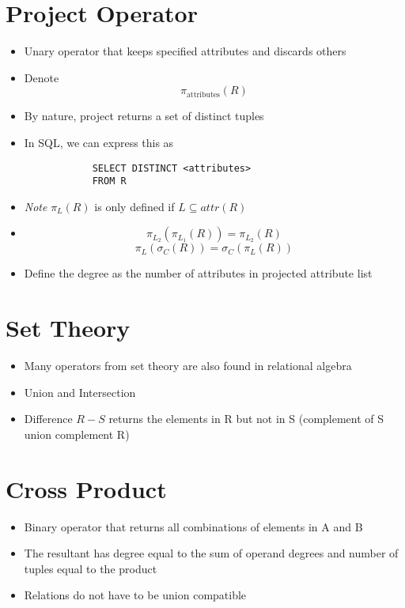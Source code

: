 \documentclass{article}
\begin{document}
\section{Project Operator}
\begin{itemize}
    \item Unary operator that keeps specified attributes and discards others
    \item Denote
        \begin{equation}
            \pi_{\text{attributes}}(R)
        \end{equation}
    \item By nature, project returns a set of distinct tuples
    \item In SQL, we can express this as
        \begin{verbatim}
            SELECT DISTINCT <attributes>
            FROM R
        \end{verbatim}
    \item \textit{Note} $\pi_L(R)$ is only defined if $L\subseteq attr(R)$
    \item
        \begin{equation}
            \pi_{L_2}(\pi_{L_1}(R)) = \pi_{L_2}(R)
        \end{equation}
        \begin{equation}
            \pi_L(\sigma_C(R)) = \sigma_C(\pi_L(R))
        \end{equation}
    \item Define the degree as the number of attributes in projected attribute list
\end{itemize}
\section{Set Theory}
\begin{itemize}
    \item Many operators from set theory are also found in relational algebra
    \item Union and Intersection
    \item Difference $R-S$ returns the elements in R but not in S (complement of S union complement R)
\end{itemize}
\section{Cross Product}
\begin{itemize}
    \item Binary operator that returns all combinations of elements in A and B
    \item The resultant has degree equal to the sum of operand degrees and number of tuples equal to the product
    \item Relations do not have to be union compatible
\end{itemize}
\end{document}
